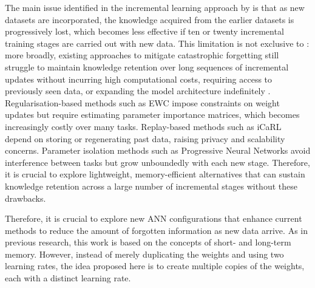 The main issue identified in the incremental learning approach by \cite{bullinaria2009} is that as new datasets are incorporated, the knowledge acquired from the earlier datasets is progressively lost, which becomes less effective if ten or twenty incremental training stages are carried out 
with new data. This limitation is not exclusive to \cite{bullinaria2009}: more broadly, 
existing approaches to mitigate catastrophic forgetting still struggle to maintain 
knowledge retention over long sequences of incremental updates without incurring high 
computational costs, requiring access to previously seen data, or expanding the model 
architecture indefinitely \cite{de2021continual, kirkpatrick2017overcoming, 
rebuffi2017icarl, rusu2016pnn}. Regularisation-based methods such as EWC 
\cite{kirkpatrick2017overcoming} impose constraints on weight updates but require 
estimating parameter importance matrices, which becomes increasingly costly over many 
tasks. Replay-based methods such as iCaRL \cite{rebuffi2017icarl} depend on storing or 
regenerating past data, raising privacy and scalability concerns. Parameter isolation 
methods such as Progressive Neural Networks \cite{rusu2016pnn} avoid interference between 
tasks but grow unboundedly with each new stage. Therefore, it is crucial to explore 
lightweight, memory-efficient alternatives that can sustain knowledge retention across 
a large number of incremental stages without these drawbacks.

Therefore, it is crucial to explore new ANN configurations that enhance current methods to reduce the amount of forgotten information as new data arrive. As in previous research, this work is based on the concepts of short- and long-term memory. However, instead of merely duplicating the weights and using two learning rates, the idea proposed here is to create multiple copies of the weights, each with a distinct learning rate.
